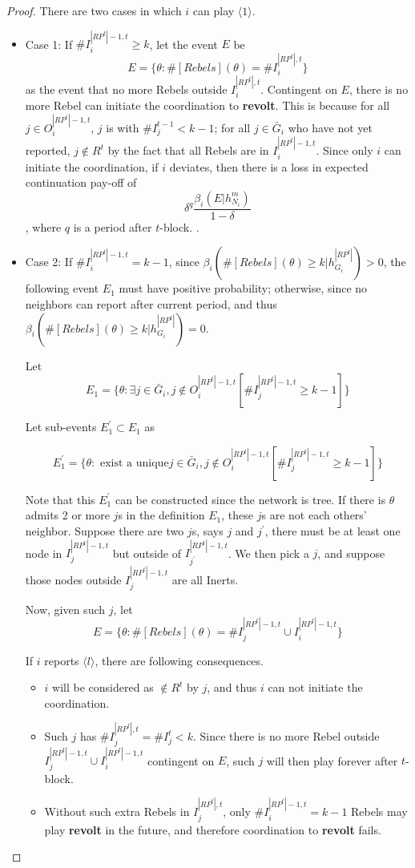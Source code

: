 \documentclass[12pt,letterpaper]{article}
\theoremstyle{definition}
\theoremstyle{remark}
\theoremstyle{claim}
\begin{document}
\begin{proof}

There are two cases in which $i$ can play $\langle 1 \rangle$.
\begin{itemize}

\item Case 1: If $\#I^{|RP^t|-1,t}_i\geq k$, let the event $E$ be
\[E=\{\theta: \#[Rebels](\theta)=\# I^{|RP^t|,t}_i\}\]
as the event that no more Rebels outside $ I^{|RP^t|,t}_i$. Contingent on $E$, there is no more Rebel can initiate the coordination to \textbf{revolt}. This is because for all $j\in O^{|RP^t|-1,t}_i$, $j$ is with $\# I^{t-1}_j< k-1$; for all $j\in \bar{G}_i$ who have not yet reported, $j\not\in R^t$ by the fact that all Rebels are in $I^{|RP^t|-1,t}_i$. Since only $i$ can initiate the coordination, if $i$ deviates, then there is a loss in expected continuation pay-off of
\[\delta^q\frac{\beta_{i}(E|h^{m}_{N_i})}{1-\delta}\], where $q$ is a period after $t$-block.
.

\item Case 2: If $\#I^{|RP^t|-1,t}_i= k-1$, since $\beta_{i}(\#[Rebels](\theta)\geq k|h^{|RP^t|}_{G_i})>0$, the following event $E_1$ must have positive probability; otherwise, since no neighbors can report after current period, and thus $\beta_{i}(\#[Rebels](\theta)\geq k|h^{|RP^t|}_{G_i})=0$.

Let
\[E_1=\{\theta: \exists j\in \bar{G}_i, j\notin O^{|RP^t|-1,t}_i [\#I^{|RP^t|-1,t}_j\geq k-1]\}\]


Let sub-events $E^{'}_1\subset E_1$ as

\[E^{'}_1=\{\theta: \text{ exist a unique} j\in \bar{G}_i, j\notin O^{|RP^t|-1,t}_i [\#I^{|RP^t|-1,t}_j\geq k-1]\}\] 

Note that this $E^{'}_1$ can be constructed since the network is tree. If there is $\theta$ admits 2 or more $j$s in the definition $E_1$, these $j$s are not each others' neighbor. Suppose there are two $j$s, says $j$ and $j^{'}$, there must be at least one node in $I^{|RP^t|-1,t}_j$ but outside of $I^{|RP^t|-1,t}_{j^{'}}$. We then pick a $j$, and suppose those nodes outside $I^{|RP^t|-1,t}_j$ are all Inerts.

Now, given such $j$, let
\[E=\{\theta:\#[Rebels](\theta)=\#I^{|RP^t|-1,t}_j\cup I^{|RP^t|-1,t}_i\}\]

If $i$ reports $\langle l \rangle$, there are following consequences.

\begin{itemize}
\item $i$ will be considered as $\notin R^t$ by $j$, and thus $i$ can not initiate the coordination.
\item Such $j$ has $\#I^{|RP^t|,t}_j=\#I^t_j<k$. Since there is no more Rebel outside $I^{|RP^t|-1,t}_j\cup I^{|RP^t|-1,t}_i$ contingent on $E$, such $j$ will then play  forever after $t$-block.
\item Without such extra Rebels in $I^{|RP^t|,t}_j$, only $\#I^{|RP^t|-1,t}_i= k-1$ Rebels may play \textbf{revolt} in the future, and therefore coordination to \textbf{revolt} fails.
\end{itemize}


\end{itemize}
\end{proof}
\end{document}
